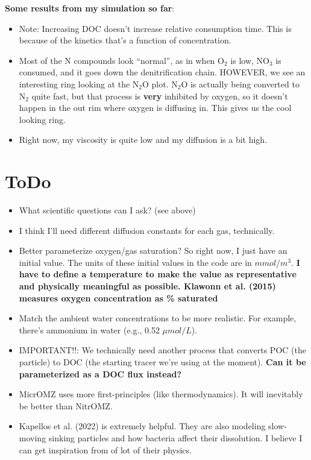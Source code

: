 \documentclass{article}
\begin{document}
\textbf{Some results from my simulation so far}:
\begin{itemize}
    \item Note: Increasing DOC doesn't increase relative consumption time. This is because of the kinetics that's a function of concentration.
    \item Most of the N compounds look ``normal'', as in when O$_2$ is low, NO$_3$ is consumed, and it goes down the denitrification chain. HOWEVER, we see an interesting ring looking at the N$_2$O plot. N$_2$O is actually being converted to N$_2$ quite fast, but that process is \textbf{very} inhibited by oxygen, so it doesn't happen in the out rim where oxygen is diffusing in. This gives us the cool looking ring.
    \item Right now, my viscosity is quite low and my diffusion is a bit high.
\end{itemize}


\section{ToDo}
\begin{itemize}
    \item What scientific questions can I ask? (see above)
    \item I think I'll need different diffusion constants for each gas, technically.
    \item Better parameterize oxygen/gas saturation? So right now, I just have an initial value. The units of these initial values in the code are in $mmol/m^3$. \textbf{I have to define a temperature to make the value as representative and physically meaningful as possible. Klawonn et al. (2015) measures oxygen concentration as \% saturated}
    \item Match the ambient water concentrations to be more realistic. For example, there's ammonium in water (e.g., 0.52 $\mu mol/L$).
    \item IMPORTANT!!: We technically need another process that converts POC (the particle) to DOC (the starting tracer we're using at the moment). \textbf{Can it be parameterized as a DOC flux instead?}
    \item MicrOMZ uses more first-principles (like thermodynamics). It will inevitably be better than NitrOMZ.
    \item Kapellos et al. (2022) is extremely helpful. They are also modeling slow-moving sinking particles and how bacteria affect their dissolution. I believe I can get inspiration from of lot of their physics.
\end{itemize}
\end{document}
